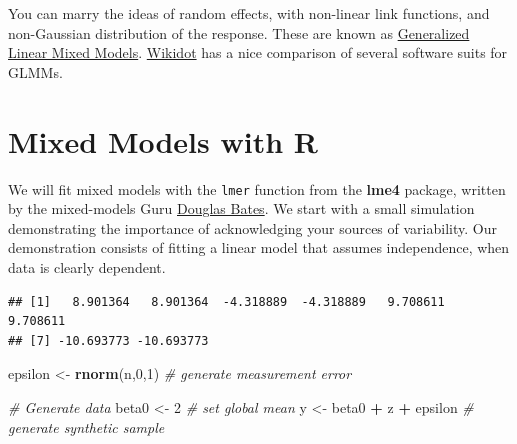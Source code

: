 \documentclass[]{book}
\newenvironment{Shaded}{\begin{snugshade}}{\end{snugshade}}
\newcommand{\KeywordTok}[1]{\textcolor[rgb]{0.13,0.29,0.53}{\textbf{#1}}}
\newcommand{\DataTypeTok}[1]{\textcolor[rgb]{0.13,0.29,0.53}{#1}}
\newcommand{\DecValTok}[1]{\textcolor[rgb]{0.00,0.00,0.81}{#1}}
\newcommand{\StringTok}[1]{\textcolor[rgb]{0.31,0.60,0.02}{#1}}
\newcommand{\CommentTok}[1]{\textcolor[rgb]{0.56,0.35,0.01}{\textit{#1}}}
\newcommand{\OperatorTok}[1]{\textcolor[rgb]{0.81,0.36,0.00}{\textbf{#1}}}
\newcommand{\NormalTok}[1]{#1}
\theoremstyle{definition}
\theoremstyle{definition}
\theoremstyle{definition}
\theoremstyle{remark}
\begin{document}
You can marry the ideas of random effects, with non-linear link
functions, and non-Gaussian distribution of the response. These are
known as
\href{https://en.wikipedia.org/wiki/Generalized_linear_mixed_model}{Generalized
Linear Mixed Models}.
\href{http://glmm.wikidot.com/pkg-comparison}{Wikidot} has a nice
comparison of several software suits for GLMMs.

\section{Mixed Models with R}\label{mixed-models-with-r}

We will fit mixed models with the \texttt{lmer} function from the
\textbf{lme4} package, written by the mixed-models Guru
\href{http://www.stat.wisc.edu/~bates/}{Douglas Bates}. We start with a
small simulation demonstrating the importance of acknowledging your
sources of variability. Our demonstration consists of fitting a linear
model that assumes independence, when data is clearly dependent.

\begin{Shaded}
\end{Shaded}

\begin{verbatim}
## [1]   8.901364   8.901364  -4.318889  -4.318889   9.708611   9.708611
## [7] -10.693773 -10.693773
\end{verbatim}

\begin{Shaded}
\begin{Highlighting}[]
\NormalTok{epsilon <-}\StringTok{ }\KeywordTok{rnorm}\NormalTok{(n,}\DecValTok{0}\NormalTok{,}\DecValTok{1}\NormalTok{) }\CommentTok{# generate measurement error}

\CommentTok{# Generate data}
\NormalTok{beta0 <-}\StringTok{ }\DecValTok{2} \CommentTok{# set global mean}
\NormalTok{y <-}\StringTok{ }\NormalTok{beta0 }\OperatorTok{+}\StringTok{ }\NormalTok{z }\OperatorTok{+}\StringTok{ }\NormalTok{epsilon }\CommentTok{# generate synthetic sample}
\end{Highlighting}
\end{Shaded}
\end{document}
